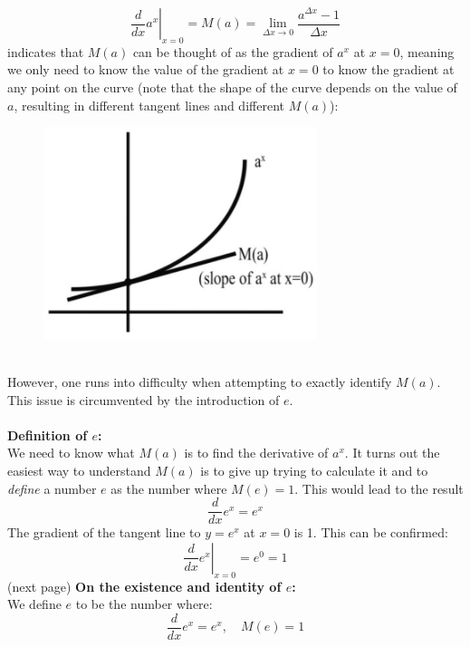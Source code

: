 \documentclass{report}
\begin{document}
\begin{equation*}
\left.\frac{d}{dx}a^x\right|_{x=0}=M(a)=\lim_{\Delta x\to0}\frac{a^{\Delta x}-1}{\Delta x}
\end{equation*}
indicates that $M(a)$ can be thought of as the gradient of $a^x$ at $x=0$, meaning we only
need to know the value of the gradient at $x=0$ to know the gradient at any point on the curve
(note that the shape of the curve depends on the value of $a$, resulting in different
tangent lines and different $M(a)$): 
\begin{figure}[h]
\includegraphics[width=8cm]{Capture16}\\
\centering
{}
\end{figure}\\
However, one runs into difficulty when attempting to exactly identify $M(a)$. This issue is
circumvented by the introduction of $e$.\\
\vspace{1mm}\\
\textbf{Definition of $e$:}\\
We need to know what $M(a)$ is to find the derivative of $a^x$. It turns out the easiest way to 
understand $M(a)$ is to give up trying to calculate it and to \textit{define} a number 
$e$ as the number where $M(e)=1$. This would lead to the result
\begin{equation*}
\frac{d}{dx}e^x=e^x
\end{equation*}
The gradient of the tangent line to $y=e^x$ at $x=0$ is 1. This can be confirmed:
\begin{equation*}
\left.\frac{d}{dx}e^x\right|_{x=0}=e^0=1
\end{equation*}
(next page)
\newpage
\noindent\textbf{On the existence and identity of $e$:}\\
We define $e$ to be the number where:
\begin{equation*}
\frac{d}{dx}e^x=e^x,\quad M(e)=1
\end{equation*}
\end{document}

